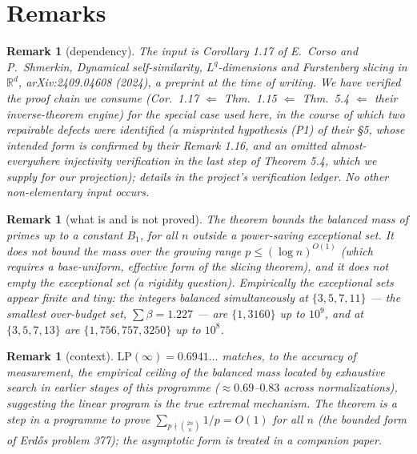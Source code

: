 \documentclass[11pt]{article}
\newtheorem{remark}[theorem]{Remark}
\begin{document}
\section{Remarks}

\begin{remark}[dependency]\label{rem:dependency}
The input is Corollary 1.17 of E.~Corso and P.~Shmerkin, \emph{Dynamical self-similarity,
$L^q$-dimensions and Furstenberg slicing in $\mathbb R^d$}, arXiv:2409.04608 (2024), a
preprint at the time of writing.  We have verified the proof chain we consume
(Cor.~1.17 $\Leftarrow$ Thm.~1.15 $\Leftarrow$ Thm.~5.4 $\Leftarrow$ their inverse-theorem
engine) for the special case used here, in the course of which two repairable defects were
identified (a misprinted hypothesis (P1) of their \S5, whose intended form is confirmed by
their Remark 1.16, and an omitted almost-everywhere injectivity verification in the last
step of Theorem 5.4, which we supply for our projection); details in the project's
verification ledger.  No other non-elementary input occurs.
\end{remark}

\begin{remark}[what is and is not proved]
The theorem bounds the balanced mass of primes up to a \emph{constant} $B_1$, for all $n$
outside a power-saving exceptional set.  It does not bound the mass over the growing range
$p\le(\log n)^{O(1)}$ (which requires a base-uniform, effective form of the slicing
theorem), and it does not empty the exceptional set (a rigidity question).  Empirically
the exceptional sets appear finite and tiny: the integers balanced simultaneously at
$\{3,5,7,11\}$ --- the smallest over-budget set, $\sum\beta=1.227$ --- are $\{1,3160\}$
up to $10^9$, and at $\{3,5,7,13\}$ are $\{1,756,757,3250\}$ up to $10^8$.
\end{remark}

\begin{remark}[context]
$\mathrm{LP}(\infty)=0.6941\ldots$ matches, to the accuracy of measurement, the empirical
ceiling of the balanced mass located by exhaustive search in earlier stages of this
programme ($\approx0.69$--$0.83$ across normalizations), suggesting the linear program is
the true extremal mechanism.  The theorem is a step in a programme to prove
$\sum_{p\nmid\binom{2n}{n}}1/p=O(1)$ for all $n$ (the bounded form of Erd\H os problem
377); the asymptotic form is treated in a companion paper.
\end{remark}
\end{document}
